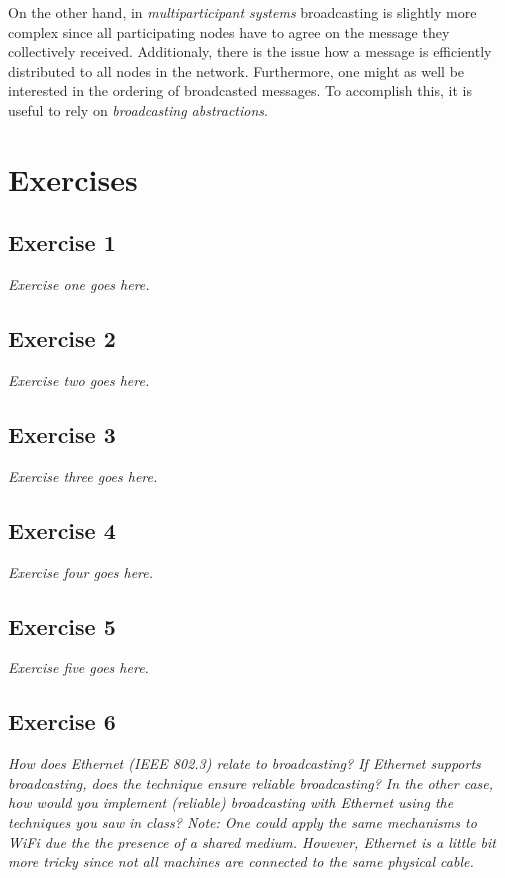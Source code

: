 On the other hand, in \emph{multiparticipant systems} broadcasting is slightly more complex since all participating nodes have to agree on the message they collectively received. Additionaly, there is the issue how a message is efficiently distributed to all nodes in the network. Furthermore, one might as well be interested in the ordering of broadcasted messages. To accomplish this, it is useful to rely on \emph{broadcasting abstractions}.

\section{Exercises}
\label{sec:exercises}

\subsection*{Exercise 1}
\label{sec:exercise_1}

\emph{Exercise one goes here.}

\subsection*{Exercise 2}
\label{sec:exercise_2}

\emph{Exercise two goes here.}

\subsection*{Exercise 3}
\label{sec:exercise_3}

\emph{Exercise three goes here.}

\subsection*{Exercise 4}
\label{sec:exercise_4}

\emph{Exercise four goes here.}

\subsection*{Exercise 5}
\label{sec:exercise_5}

\emph{Exercise five goes here.}

\subsection*{Exercise 6}
\label{sec:exercise_6}

\emph{How does Ethernet (IEEE 802.3) relate to broadcasting? If Ethernet supports broadcasting, does the technique ensure reliable broadcasting? In the other case, how would you implement (reliable) broadcasting with Ethernet using the techniques you saw in class? Note: One could apply the same mechanisms to WiFi due the the presence of a shared medium. However, Ethernet is a little bit more tricky since not all machines are connected to the same physical cable.}

